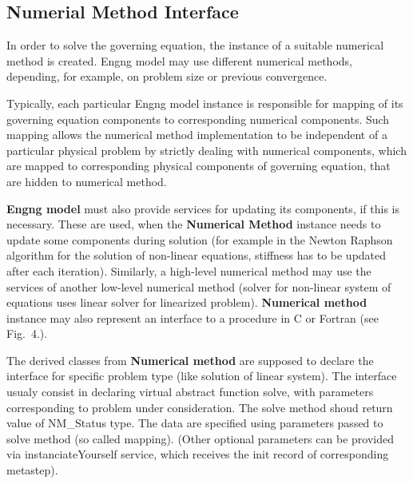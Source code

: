 \documentclass[a4paper]{article}
\newcommand{\class}[1]{{\bf #1}}
\begin{document}
\subsection{Numerial Method Interface}
In order
to solve the governing equation, the  instance of a suitable numerical method
is created. Engng model may use different numerical methods,
depending, for example, on problem size or previous convergence. 

Typically, each particular Engng model instance is responsible
for mapping of its governing equation components to corresponding
numerical components. Such mapping allows the numerical method implementation
to be independent of a particular physical problem by strictly dealing
with numerical components, which are mapped to corresponding physical
components of governing equation, that are  hidden to numerical method.

\class{Engng model} must also provide services for updating its
components, if this is necessary. These are used, when the \class{Numerical
Method} instance needs to update  some components during solution (for
example in the Newton Raphson algorithm for the solution of non-linear
equations, stiffness has to be updated after each
iteration). Similarly,  
a high-level numerical method may use the services of another
low-level numerical method (solver for non-linear system  of equations
uses  linear solver for linearized problem). \class{Numerical method}
instance may also represent an interface to a procedure in C or
Fortran (see Fig.~4.). 





The derived classes from \class{Numerical method} are supposed to
declare the interface for specific problem type
(like solution of linear system). The interface usualy consist in
declaring virtual abstract function solve, with parameters corresponding
to problem under consideration. The solve method shoud return
value of NM\_Status type. The data are specified using parameters passed to solve method (so called
mapping). (Other optional parameters can be provided via instanciateYourself
service, which receives the init record of corresponding metastep).
\end{document}
